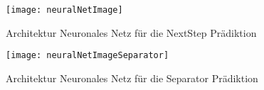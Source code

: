 \begin{figure}[h]
    \centering
	\texttt{[image: neuralNetImage]}
	\caption{Architektur Neuronales Netz für die NextStep Prädiktion}
	\label{fig:netArchitectureNextStep}
\end{figure}

% 

\begin{figure}[h]
    \centering
	\texttt{[image: neuralNetImageSeparator]}
	\caption{Architektur Neuronales Netz für die Separator Prädiktion}
	\label{fig:netArchitectureSep}
\end{figure}


